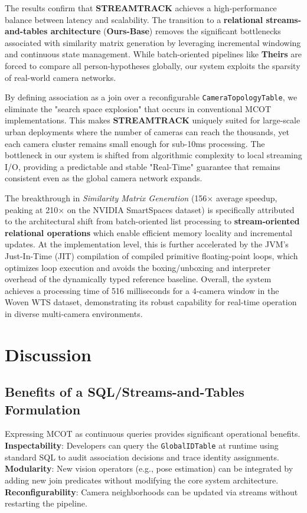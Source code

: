 \documentclass[11pt]{article}
\begin{document}
The results confirm that \textbf{STREAMTRACK} achieves a high-performance balance between latency and scalability. The transition to a \textbf{relational streams-and-tables architecture} (\textbf{Ours-Base}) removes the significant bottlenecks associated with similarity matrix generation by leveraging incremental windowing and continuous state management. While batch-oriented pipelines like \textbf{Theirs} are forced to compare all person-hypotheses globally, our system exploits the sparsity of real-world camera networks. 

By defining association as a join over a reconfigurable \texttt{CameraTopologyTable}, we eliminate the "search space explosion" that occurs in conventional MCOT implementations. This makes \textbf{STREAMTRACK} uniquely suited for large-scale urban deployments where the number of cameras can reach the thousands, yet each camera cluster remains small enough for sub-10ms processing. The bottleneck in our system is shifted from algorithmic complexity to local streaming I/O, providing a predictable and stable "Real-Time" guarantee that remains consistent even as the global camera network expands.

The breakthrough in \emph{Similarity Matrix Generation} (156$\times$ average speedup, peaking at 210$\times$ on the NVIDIA SmartSpaces dataset) is specifically attributed to the architectural shift from batch-oriented list processing to \textbf{stream-oriented relational operations} which enable efficient memory locality and incremental updates. At the implementation level, this is further accelerated by the JVM's Just-In-Time (JIT) compilation of compiled primitive floating-point loops, which optimizes loop execution and avoids the boxing/unboxing and interpreter overhead of the dynamically typed reference baseline. Overall, the system achieves a processing time of 516 milliseconds for a 4-camera window in the Woven WTS dataset, demonstrating its robust capability for real-time operation in diverse multi-camera environments.





\section{Discussion}\label{sec:discussion}
\subsection{Benefits of a SQL/Streams-and-Tables Formulation}
Expressing MCOT as continuous queries provides significant operational benefits. \textbf{Inspectability}: Developers can query the \texttt{GlobalIDTable} at runtime using standard SQL to audit association decisions and trace identity assignments. \textbf{Modularity}: New vision operators (e.g., pose estimation) can be integrated by adding new join predicates without modifying the core system architecture. \textbf{Reconfigurability}: Camera neighborhoods can be updated via streams without restarting the pipeline.
\end{document}
